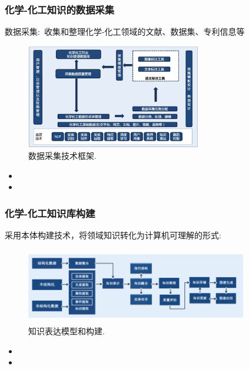 \begin{frame}
	\frametitle{化学-化工知识的数据采集}
数据采集:~收集和整理化学-化工领域的文献、数据集、专利信息等
\begin{figure}[h!]
\centering
\includegraphics[height=1.80in,width=3.00in,viewport=0 0 240 150,clip]{Figures/KG_Chem-Tech_Frame.png}
\caption{\tiny 数据采集技术框架.}%
\label{KG_Chem-Tech-Frame}
\end{figure}
\vspace*{-0.1in}
\begin{itemize}
	\item {\fontsize{7.2pt}{5.2pt}\selectfont{建立规范的数据采集流程，确保数据的准确性和完整性}}
\item {\fontsize{7.2pt}{5.2pt}\selectfont{对业务进行建模，明确了化学化工领域的概念和关系，为后续知识图谱构建奠定基础}}
\end{itemize}
\end{frame}

\begin{frame}
	\frametitle{化学-化工知识库构建}
	采用本体构建技术，将领域知识转化为计算机可理解的形式:~
\begin{figure}[h!]
\centering
\includegraphics[height=1.30in,width=3.80in,viewport=0 0 200 57,clip]{Figures/KG_Chem-data-flow.png}
\caption{\tiny 知识表达模型和构建.}%
\label{KG_Chem-data-flow}
\end{figure}
	\begin{itemize}
		\item {\fontsize{7.2pt}{5.2pt}\selectfont{创建本体的概念、属性和关系，并进行本体的验证和优化}}
		\item {\fontsize{7.2pt}{5.2pt}\selectfont{对知识库进行了组织和分类，使用户可以方便地浏览和检索相关信息}}
	\end{itemize}
\end{frame}

